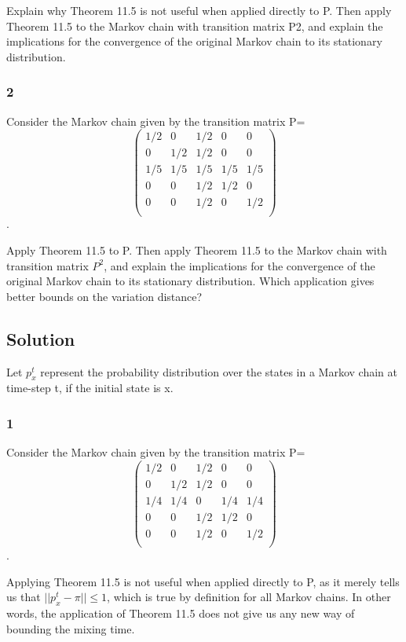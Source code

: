 \documentclass[10pt]{amsart}
\theoremstyle{remark}
\begin{document}
Explain why Theorem 11.5 is not useful when applied directly to P. Then apply Theorem 11.5 to the Markov chain with transition matrix P2, and explain the implications for the convergence of the original Markov chain to its stationary distribution.

\subsubsection{2} Consider the Markov chain given by the transition matrix
P=\[ \left( \begin{array}{ccccc}
1/2 & 0 & 1/2 & 0 & 0 \\
0 & 1/2 & 1/2 & 0 & 0 \\
1/5 & 1/5 & 1/5 & 1/5 & 1/5 \\
0 & 0 & 1/2 & 1/2 & 0 \\
0 & 0 & 1/2 & 0 & 1/2 \\
\end{array} \right)\].

Apply Theorem 11.5 to P. Then apply Theorem 11.5 to the Markov chain with transition matrix $P^{2}$, and explain the implications for the convergence of the original Markov chain to its stationary distribution. Which application gives better bounds on the variation distance?


\subsection{Solution}

Let $p_{x}^{t}$ represent the probability distribution over the states in a Markov chain at time-step t, if the initial state is x.

\subsubsection{1} Consider the Markov chain given by the transition matrix
P=\[ \left( \begin{array}{ccccc}
1/2 & 0 & 1/2 & 0 & 0 \\
0 & 1/2 & 1/2 & 0 & 0 \\
1/4 & 1/4 & 0 & 1/4 & 1/4 \\
0 & 0 & 1/2 & 1/2 & 0 \\
0 & 0 & 1/2 & 0 & 1/2 \\
\end{array} \right)\].

Applying Theorem 11.5 is not useful when applied directly to P, as it merely tells us that $||p_{x}^{t}-\pi|| \leq 1$, which is true by definition for all Markov chains. In other words, the application of Theorem 11.5 does not give us any new way of bounding the mixing time.
\end{document}

